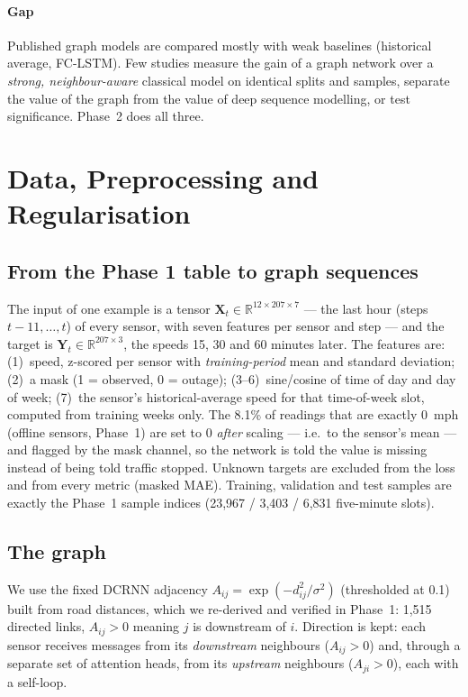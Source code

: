 \paragraph{Gap} Published graph models are compared mostly with weak baselines (historical average, FC-LSTM). Few studies measure the gain of a graph network over a \emph{strong, neighbour-aware} classical model on identical splits and samples, separate the value of the graph from the value of deep sequence modelling, or test significance. Phase~2 does all three.

\section{Data, Preprocessing and Regularisation}
\subsection{From the Phase 1 table to graph sequences}
The input of one example is a tensor $\mathbf{X}_t\in\mathbb{R}^{12\times 207\times 7}$ --- the last hour (steps $t-11,\dots,t$) of every sensor, with seven features per sensor and step --- and the target is $\mathbf{Y}_t\in\mathbb{R}^{207\times3}$, the speeds 15, 30 and 60 minutes later. The features are: (1)~speed, z-scored per sensor with \emph{training-period} mean and standard deviation; (2)~a mask (1 = observed, 0 = outage); (3--6)~sine/cosine of time of day and day of week; (7)~the sensor's historical-average speed for that time-of-week slot, computed from training weeks only. The 8.1\% of readings that are exactly 0~mph (offline sensors, Phase~1) are set to 0 \emph{after} scaling --- i.e.\ to the sensor's mean --- and flagged by the mask channel, so the network is told the value is missing instead of being told traffic stopped. Unknown targets are excluded from the loss and from every metric (masked MAE). Training, validation and test samples are exactly the Phase~1 sample indices (23{,}967 / 3{,}403 / 6{,}831 five-minute slots).

\subsection{The graph}
We use the fixed DCRNN adjacency $A_{ij}=\exp(-d_{ij}^2/\sigma^2)$ (thresholded at 0.1) built from road distances, which we re-derived and verified in Phase~1: 1{,}515 directed links, $A_{ij}>0$ meaning $j$ is downstream of $i$. Direction is kept: each sensor receives messages from its \emph{downstream} neighbours ($A_{ij}>0$) and, through a separate set of attention heads, from its \emph{upstream} neighbours ($A_{ji}>0$), each with a self-loop.

